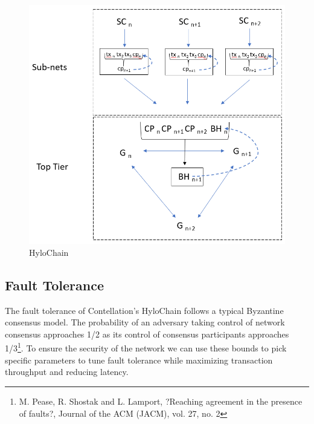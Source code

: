 \documentclass{article}
\begin{document}
\begin{figure}[H]
\centering
\includegraphics[scale=0.65]{HyloChain.png}
\caption{HyloChain}
\end{figure} 

\subsection{Fault Tolerance}
The fault tolerance of Contellation's HyloChain follows a typical Byzantine consensus model. The probability of an adversary taking control of network consensus approaches 1/2 as its control of consensus participants approaches 1/3\footnote{M. Pease, R. Shostak and L. Lamport, ?Reaching agreement in the presence of faults?, Journal of the ACM (JACM), vol. 27, no. 2}. To ensure the security of the network we can use these bounds to pick specific parameters to tune fault tolerance while maximizing transaction throughput and reducing latency. 
\end{document}
